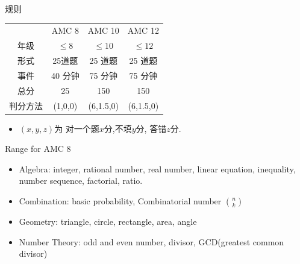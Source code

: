 \documentclass{beamer}
\theoremstyle{definition}
\begin{document}
\begin{frame}{规则}
    \begin{table}
        \centering
        \begin{tabular}{c|c|c|c}
            \hline
                     & AMC  8  & AMC 10    & AMC 12    \\
            年级     & $\le 8$ & $\le 10$  & $\le 12$  \\
            形式     & 25道题  & 25 道题   & 25 道题   \\
            事件     & 40 分钟 & 75  分钟  & 75  分钟  \\
            总分     & 25      & 150       & 150       \\
            判分方法 & (1,0,0) & (6,1.5,0) & (6,1.5,0) \\
            \hline
        \end{tabular}
    \end{table}
    \begin{itemize}
        \item  $(x,y,z)$为 对一个题$x$分,不填$y$分, 答错$z$分.
    \end{itemize}

\end{frame}
\begin{frame}{Range for AMC 8}
    \begin{itemize}
        \item Algebra: integer, rational number, real number, linear equation, inequality, number sequence, factorial, ratio.
        \item Combination: basic probability, Combinatorial number $\binom{n}{k}$
        \item Geometry: triangle, circle, rectangle, area, angle
        \item Number Theory: odd and even number,  divisor, GCD(greatest common divisor)
    \end{itemize}
\end{frame}
\end{document}
